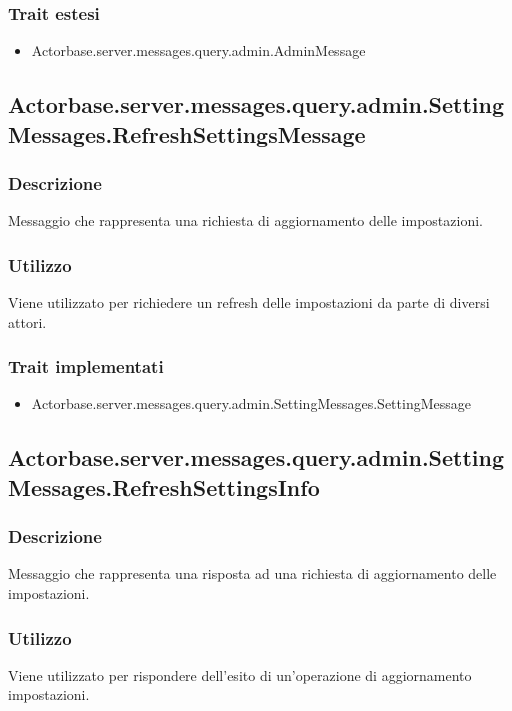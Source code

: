 \documentclass[a4paper]{article}
\begin{document}
			\subsubsection{Trait estesi}
				\begin{itemize}
					\item Actorbase.server.messages.query.admin.AdminMessage
					\end{itemize}
					
						\subsection{Actorbase.server.messages.query.admin.SettingMessages.RefreshSettingsMessage}
			\subsubsection{Descrizione}
				Messaggio che rappresenta una richiesta di aggiornamento delle impostazioni.
			\subsubsection{Utilizzo}
				Viene utilizzato per richiedere un refresh delle impostazioni da parte di diversi attori.
				
			\subsubsection{Trait implementati}
				\begin{itemize}
					\item Actorbase.server.messages.query.admin.SettingMessages.SettingMessage
					\end{itemize}
					
\subsection{Actorbase.server.messages.query.admin.SettingMessages.RefreshSettingsInfo}
			\subsubsection{Descrizione}
				Messaggio che rappresenta una risposta ad una richiesta di aggiornamento delle impostazioni.
			\subsubsection{Utilizzo}
				Viene utilizzato per rispondere dell'esito di un'operazione di aggiornamento impostazioni.
				
\end{document}
